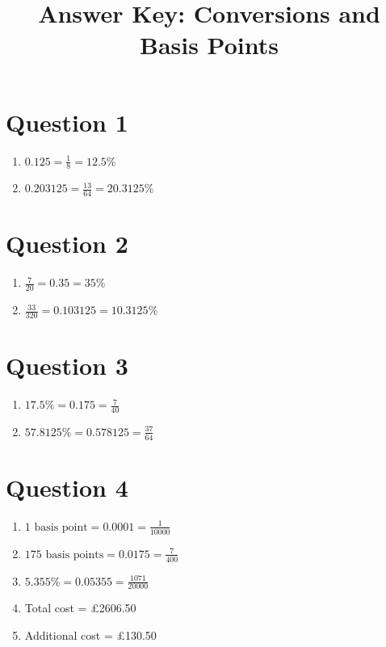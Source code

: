 \documentclass[12pt]{article}
\begin{document}
\title{Answer Key: Conversions and Basis Points}
\date{}
\maketitle

\section*{Question 1}
\begin{enumerate}[label=(\alph*)]
    \item \( 0.125 = \frac{1}{8} = 12.5\% \)
    \item \( 0.203125 = \frac{13}{64} = 20.3125\% \)
\end{enumerate}

\section*{Question 2}
\begin{enumerate}[label=(\alph*)]
    \item \( \frac{7}{20} = 0.35 = 35\% \)
    \item \( \frac{33}{320} = 0.103125 = 10.3125\% \)
\end{enumerate}

\section*{Question 3}
\begin{enumerate}[label=(\alph*)]
    \item \( 17.5\% = 0.175 = \frac{7}{40} \)
    \item \( 57.8125\% = 0.578125 = \frac{37}{64} \)
\end{enumerate}

\section*{Question 4}
\begin{enumerate}[label=(\alph*)]
    \item \(1 \text{ basis point} = 0.0001 = \frac{1}{10000}\)
    \item \(175 \text{ basis points} = 0.0175 = \frac{7}{400}\)
    \item \(5.355\% = 0.05355 = \frac{1071}{20000}\)
    \item Total cost = £2606.50
    \item Additional cost = £130.50
\end{enumerate}
\end{document}
